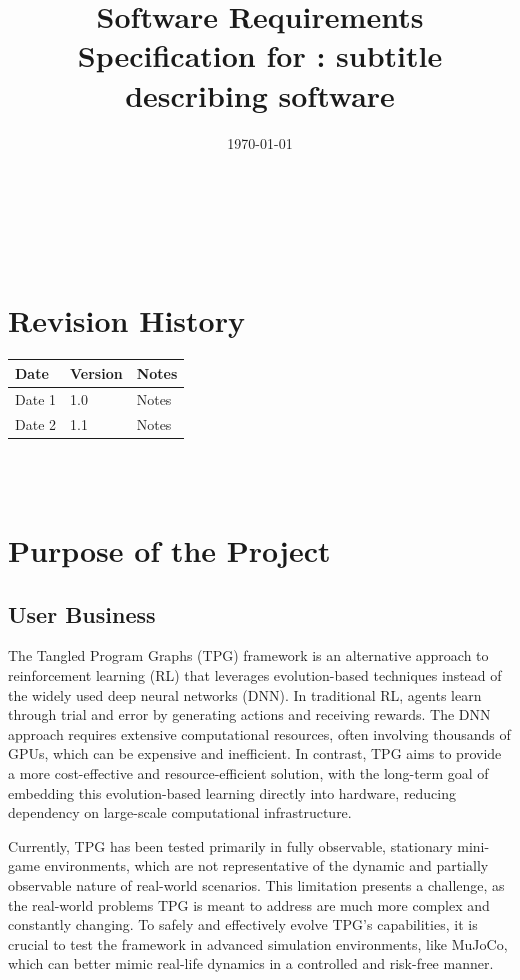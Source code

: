 \documentclass[12pt]{article}
\begin{document}
\title{Software Requirements Specification for \progname: subtitle describing software} 
\author{\authname}
\date{\today}
	
\maketitle

~\newpage


\tableofcontents

~\newpage

\section*{Revision History}

\begin{tabularx}{\textwidth}{p{3cm}p{2cm}X}
\toprule {\textbf{Date}} & {\textbf{Version}} & {\textbf{Notes}}\\
\midrule
Date 1 & 1.0 & Notes\\
Date 2 & 1.1 & Notes\\
\bottomrule
\end{tabularx}

~\\

~\newpage
\section{Purpose of the Project}
\subsection{User Business}
The Tangled Program Graphs (TPG) framework is an alternative approach to reinforcement learning (RL) that leverages evolution-based techniques instead of the widely used deep neural networks (DNN). In traditional RL, agents learn through trial and error by generating actions and receiving rewards. The DNN approach requires extensive computational resources, often involving thousands of GPUs, which can be expensive and inefficient. In contrast, TPG aims to provide a more cost-effective and resource-efficient solution, with the long-term goal of embedding this evolution-based learning directly into hardware, reducing dependency on large-scale computational infrastructure.

Currently, TPG has been tested primarily in fully observable, stationary mini-game environments, which are not representative of the dynamic and partially observable nature of real-world scenarios. This limitation presents a challenge, as the real-world problems TPG is meant to address are much more complex and constantly changing. To safely and effectively evolve TPG's capabilities, it is crucial to test the framework in advanced simulation environments, like MuJoCo, which can better mimic real-life dynamics in a controlled and risk-free manner.
\end{document}
